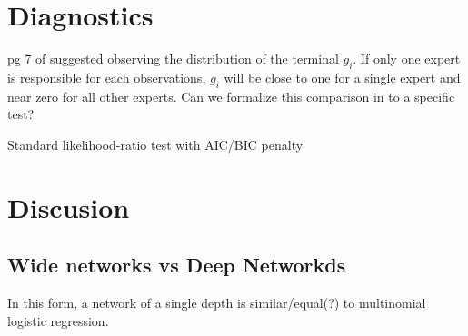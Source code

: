 \documentclass[12pt]{article}
\begin{document}

\section{Diagnostics}
pg 7 of \cite{WMS} suggested observing the distribution of the terminal $g_{i}$. If only one expert is responsible for each observations, $g_{i}$ will be close to one for a single expert and near zero for all other experts. Can we formalize this comparison in to a specific test?

Standard likelihood-ratio test with AIC/BIC penalty


  
\section{Discusion}
\subsection{Wide networks vs Deep Networkds}
In this form, a network of a single depth is similar/equal(?) to multinomial logistic regression.
\end{document}
